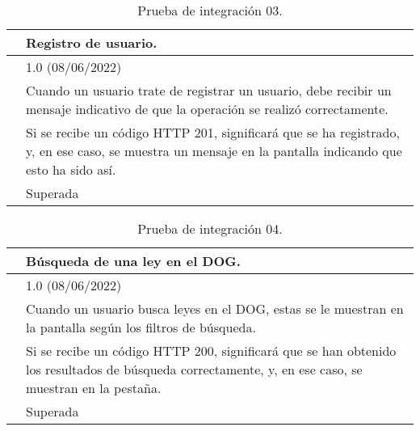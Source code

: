\begin{table}[H]
\begin{center}
\begin{tabular}{|p{3cm}|p{10cm}|} \hline
\centering {\bf PI-03} & Registro de usuario.  \\ \hline\hline
\centering {\bf Versión} & 1.0 (08/06/2022) \\ \hline
\centering {\bf Descripción} & Cuando un usuario trate de registrar un usuario, debe recibir un mensaje indicativo de que la operación se realizó correctamente. \\ \hline
\centering {\bf Criterio de aceptación} & Si se recibe un código HTTP 201, significará que se ha registrado, y, en ese caso, se muestra un mensaje en la pantalla indicando que esto ha sido así. \\ \hline
\centering {\bf Estado} & Superada \\ \hline
\end{tabular}
\caption{Prueba de integración 03.}
\label{enlacePI3}
\end{center}
\end{table}

\begin{table}[H]
\begin{center}
\begin{tabular}{|p{3cm}|p{10cm}|} \hline
\centering {\bf PI-04} & Búsqueda de una ley en el DOG.  \\ \hline\hline
\centering {\bf Versión} & 1.0 (08/06/2022) \\ \hline
\centering {\bf Descripción} & Cuando un usuario busca leyes en el DOG, estas se le muestran en la pantalla según los filtros de búsqueda. \\ \hline
\centering {\bf Criterio de aceptación} & Si se recibe un código HTTP 200, significará que se han obtenido los resultados de búsqueda correctamente, y, en ese caso, se muestran en la pestaña. \\ \hline
\centering {\bf Estado} & Superada \\ \hline
\end{tabular}
\caption{Prueba de integración 04.}
\label{enlacePI4}
\end{center}
\end{table}

